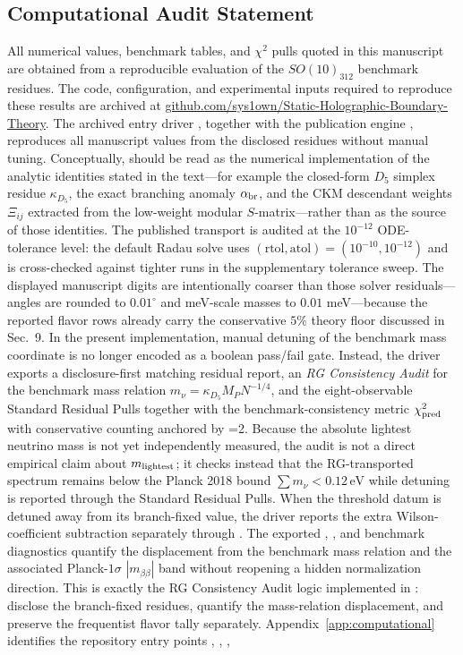 \documentclass[11pt]{article}
\begin{document}
\subsection*{Computational Audit Statement}

All numerical values, benchmark tables, and $\chi^2$ pulls quoted in this manuscript are obtained from a reproducible evaluation of the $SO(10)_{312}$ benchmark residues. The code, configuration, and experimental inputs required to reproduce these results are archived at \url{github.com/sys1own/Static-Holographic-Boundary-Theory}. The archived entry driver , together with the publication engine , reproduces all manuscript values from the disclosed residues without manual tuning. Conceptually,  should be read as the numerical implementation of the analytic identities stated in the text---for example the closed-form $D_5$ simplex residue $\kappa_{D_5}$, the exact branching anomaly $\alpha_{\rm br}$, and the CKM descendant weights $\Xi_{ij}$ extracted from the low-weight modular $S$-matrix---rather than as the source of those identities. The published transport is audited at the $10^{-12}$ ODE-tolerance level: the default Radau solve uses $(\mathrm{rtol},\mathrm{atol})=(10^{-10},10^{-12})$ and is cross-checked against tighter runs in the supplementary tolerance sweep. The displayed manuscript digits are intentionally coarser than those solver residuals---angles are rounded to $0.01^\circ$ and meV-scale masses to $0.01$ meV---because the reported flavor rows already carry the conservative $5\%$ theory floor discussed in Sec.~9. In the present implementation, manual detuning of the benchmark mass coordinate is no longer encoded as a boolean pass/fail gate. Instead, the driver exports a disclosure-first matching residual report, an \emph{RG Consistency Audit} for the benchmark mass relation $m_\nu=\kappa_{D_5}M_PN^{-1/4}$, and the eight-observable Standard Residual Pulls together with the benchmark-consistency metric $\chi_{\rm pred}^2$ with conservative counting anchored by =2. Because the absolute lightest neutrino mass is not yet independently measured, the audit is not a direct empirical claim about $m_{\rm lightest}$; it checks instead that the RG-transported spectrum remains below the Planck 2018 bound $\sum m_\nu < 0.12\,\mathrm{eV}$ while detuning is reported through the Standard Residual Pulls. When the threshold datum is detuned away from its branch-fixed value, the driver reports the extra Wilson-coefficient subtraction separately through . The exported , , and benchmark diagnostics quantify the displacement from the benchmark mass relation and the associated Planck-$1\sigma$ $|m_{\beta\beta}|$ band without reopening a hidden normalization direction. This is exactly the RG Consistency Audit logic implemented in : disclose the branch-fixed residues, quantify the mass-relation displacement, and preserve the frequentist flavor tally separately. Appendix~\ref{app:computational} identifies the repository entry points , , , 
\end{document}
